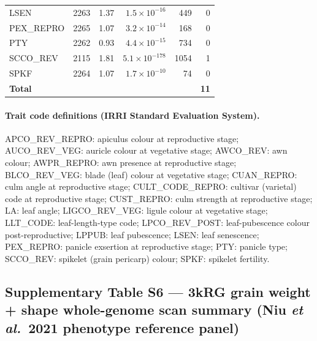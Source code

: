\begin{table}[htbp]
\begin{tabular}{lrrrrr}
LSEN              & 2263 & 1.37 & $1.5\times10^{-16}$  & 449  & 0 \\
PEX\_REPRO        & 2265 & 1.07 & $3.2\times10^{-14}$  & 168  & 0 \\
PTY               & 2262 & 0.93 & $4.4\times10^{-15}$  & 734  & 0 \\
SCCO\_REV         & 2115 & 1.81 & $5.1\times10^{-178}$ & 1054 & 1 \\
SPKF              & 2264 & 1.07 & $1.7\times10^{-10}$  & 74   & 0 \\
\midrule
\textbf{Total}    &      &      &                      &      & \textbf{11} \\
\bottomrule
\end{tabular}
\end{table}

\paragraph{Trait code definitions (IRRI Standard Evaluation System).}
APCO\_REV\_REPRO: apiculus colour at reproductive stage;
AUCO\_REV\_VEG: auricle colour at vegetative stage;
AWCO\_REV: awn colour;
AWPR\_REPRO: awn presence at reproductive stage;
BLCO\_REV\_VEG: blade (leaf) colour at vegetative stage;
CUAN\_REPRO: culm angle at reproductive stage;
CULT\_CODE\_REPRO: cultivar (varietal) code at reproductive stage;
CUST\_REPRO: culm strength at reproductive stage;
LA: leaf angle;
LIGCO\_REV\_VEG: ligule colour at vegetative stage;
LLT\_CODE: leaf-length-type code;
LPCO\_REV\_POST: leaf-pubescence colour post-reproductive;
LPPUB: leaf pubescence;
LSEN: leaf senescence;
PEX\_REPRO: panicle exsertion at reproductive stage;
PTY: panicle type;
SCCO\_REV: spikelet (grain pericarp) colour;
SPKF: spikelet fertility.

\clearpage

\subsection*{Supplementary Table S6 --- 3kRG grain weight + shape whole-genome scan summary (Niu \emph{et al.}\ 2021 phenotype reference panel)}



